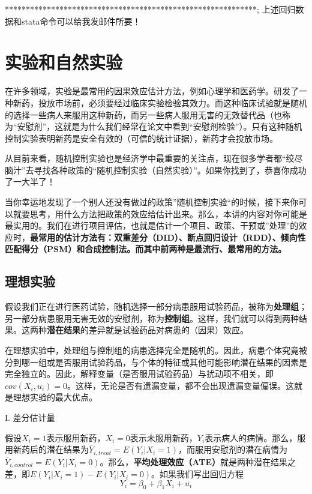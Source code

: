 \documentclass[cn,10pt,math=newtx,citestyle=gb7714-2015,bibstyle=gb7714-2015]{elegantbook}
\begin{document}
	************************************************************;
	上述回归数据和stata命令可以给我发邮件所要！
	
	
	
	
	\chapter{实验和自然实验}
	在许多领域，实验是最常用的因果效应估计方法，例如心理学和医药学。研发了一种新药，投放市场前，必须要经过临床实验检验其效力。而这种临床试验就是随机的选择一些病人来服用这种新药，而另一些病人服用无害的无效替代品（也称为“安慰剂”，这就是为什么我们经常在论文中看到“安慰剂检验”）。只有这种随机控制实验表明新药是安全有效的（可信的统计证据），新药才会投放市场。
	
	从目前来看，随机控制实验也是经济学中最重要的关注点，现在很多学者都“绞尽脑汁”去寻找各种政策的“随机控制实验（自然实验）”。如果你找到了，恭喜你成功了一大半了！
	
	当你幸运地发现了一个别人还没有做过的政策”随机控制实验“的时候，接下来你可以就要思考，用什么方法把政策的效应给估计出来。那么，本讲的内容对你可能是最实用的。我们在进行项目评估，也就是估计一个项目、政策、干预或”处理”的效应时，\textbf{最常用的估计方法有：双重差分（DID）、断点回归设计（RDD）、倾向性匹配得分（PSM）和合成控制法。而其中前两种是最流行、最常用的方法。}
	
	\section{理想实验}
	
	假设我们正在进行医药试验，随机选择一部分病患服用试验药品，被称为\textbf{处理组}；另一部分病患服用无害无效的安慰剂，称为\textbf{控制组}。这样，我们就可以得到两种结果。这两种\textbf{潜在结果}的差异就是试验药品对病患的（因果）效应。
	
	在理想实验中，处理组与控制组的病患选择完全是随机的。因此，病患个体究竟被分到哪一组或是否服用试验药品，与个体的特征或其他可能影响潜在结果的因素是完全独立的。因此，解释变量（是否服用试验药品）与扰动项不相关，即$cov(X_i,u_i)=0$。这样，无论是否有遗漏变量，都不会出现遗漏变量偏误。这就是理想实验的最大优点。
	
	I. 差分估计量
	
	假设$X_i=1$表示服用新药，$X_i=0$表示未服用新药，$Y_i$表示病人的病情。那么，服用新药后的潜在结果为$\overline{Y}_{i,treat}=E(Y_i\big|X_i=1)$，而服用安慰剂的潜在病情为$\overline{Y}_{i,control}=E(Y_i\big|X_i=0)$。那么，\textbf{平均处理效应（ATE）}就是两种潜在结果之差，即$E(Y_i\big|X_i=1)-E(Y_i\big|X_i=0)$。如果我们写出回归方程
	\begin{equation}
		Y_i=\beta_0+\beta_1X_i+u_i
	\end{equation}
	
\end{document}
